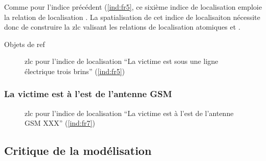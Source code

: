 Comme pour l'indice précédent (\ref{ind:fr5}, ce sixième indice de
localisation emploie la relation de localisation
.
%
La spatialisation de cet indice de localisaiton nécessite donc de
construire la \ac{zlc} valisant les relations de localisation
atomiques  et .

Objets de ref

\begin{figure}
  \centering
  
  \caption{\ac{zlc} pour l'indice de localisation \enquote{La victime
      est sous une ligne électrique trois brins} (\ref{ind:fr5})}
\end{figure}


\subsubsection{La victime est à l'est de l'antenne GSM}


\begin{figure}
  \centering
  
  \caption{\ac{zlc} pour l'indice de localisation \enquote{La victime
      est à l'est de l'antenne GSM XXX} (\ref{ind:fr7})}
\end{figure}

\subsection{Critique de la modélisation}
\label{subsec:9-4-3}

